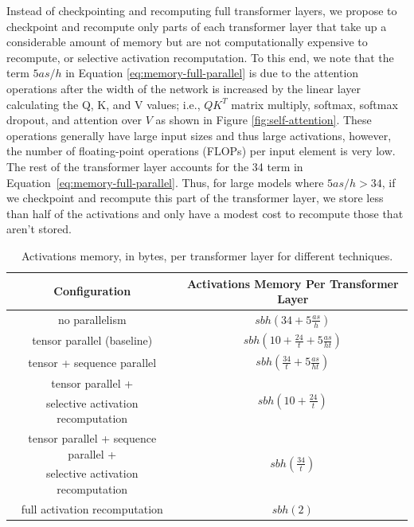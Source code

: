 \documentclass{article}
\begin{document}
Instead of checkpointing and recomputing full transformer layers, we propose to checkpoint and recompute only parts of each transformer layer that take up a considerable amount of memory but are not computationally expensive to recompute, or selective activation recomputation. To this end, we note that the term $5as/h$ in Equation \ref{eq:memory-full-parallel} is due to the attention operations after the width of the network is increased by the linear layer calculating the Q, K, and V values; i.e., $QK^T$ matrix multiply, softmax, softmax dropout, and attention over $V$ as shown in Figure \ref{fig:self-attention}. These operations generally have large input sizes and thus large activations, however, the number of floating-point operations (FLOPs) per input element is very low. The rest of the transformer layer accounts for the 34 term in Equation~\ref{eq:memory-full-parallel}. Thus, for large models where $5as/h > 34$, if we checkpoint and recompute this part of the transformer layer, we store less than half of the activations and only have a modest cost to recompute those that aren't stored. 

\begin{table}
    \centering
    \begin{tabular}{c|c}
        Configuration & Activations Memory Per Transformer Layer \\
        \hline
        \multirow{2}{*}{no parallelism} & \multirow{2}{*}{$sbh \left(34 + 5 \frac{as}{h}\right)$} \\ \\ \hline
        \multirow{2}{*}{tensor parallel (baseline)} & \multirow{2}{*}{$sbh \left(10 + \frac{24}{t} + 5 \frac{as}{ht}\right)$} \\ \\ \hline
        \multirow{2}{*}{tensor + sequence parallel} & \multirow{2}{*}{$sbh \left(\frac{34}{t} + 5 \frac{as}{ht}\right)$} \\ \\ \hline
        tensor parallel +  & \multirow{2}{*}{$sbh \left(10 + \frac{24}{t}\right)$} \\ 
        selective activation recomputation & \\ \hline
        tensor parallel + sequence parallel +  & \multirow{2}{*}{$sbh(\frac{34}{t})$} \\ 
        selective activation recomputation & \\\hline
        \multirow{2}{*}{full activation recomputation} & \multirow{2}{*}{$sbh(2)$} \\ &
    \end{tabular}
    \caption{Activations memory, in bytes, per transformer layer for different techniques. }
    \label{tab:memory-eqns}
\end{table}
\end{document}
